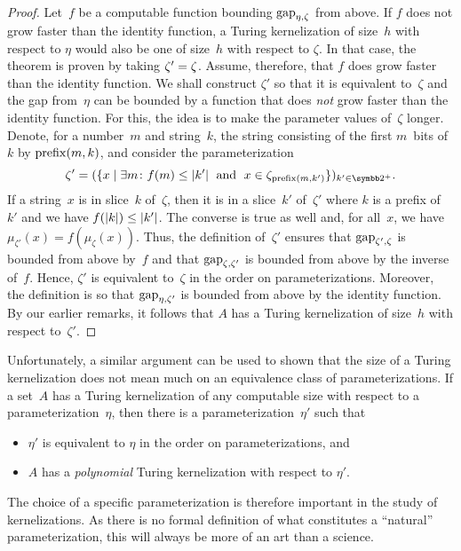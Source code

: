 \begin{proof}
  Let~$f$ be a computable function bounding $\operatorname{gap}_{\eta, \zeta}$ from above.
  If $f$ does not grow faster than the identity function, a Turing kernelization of size~$h$ with respect to $\eta$ would also be one of size~$h$ with respect to $\zeta$.
  In that case, the theorem is proven by taking $\zeta' = \zeta$.
  Assume, therefore, that $f$ does grow faster than the identity function.
  We shall construct $\zeta'$ so that it is equivalent to~$\zeta$ and the gap from~$\eta$ can be bounded by a function that does \emph{not} grow faster than the identity function.
  For this, the idea is to make the parameter values of~$\zeta$ longer.
  Denote, for a number~$m$ and string~$k$, the string consisting of the first $m$~bits of~$k$ by $\operatorname{prefix}(m, k)$, and consider the parameterization
  \begin{equation*}
    \zeta' \deq (\{x \st \exists m\colon f(m) \le \length{k'} \reland x \in \zeta_{\prefix(m, k')}\})_{k' \in \binary^+}.
  \end{equation*}
  If a string~$x$ is in slice~$k$ of~$\zeta$, then it is in a slice~$k'$ of~$\zeta'$ where $k$ is a prefix of~$k'$ and we have $f({\lvert k\rvert}) \le {\lvert k'\rvert}$.
  The converse is true as well and, for all~$x$, we have $\mu_{\zeta'}(x) = f(\mu_\zeta(x))$.
  Thus, the definition of~$\zeta'$ ensures that $\operatorname{gap}_{\zeta', \zeta}$ is bounded from above by~$f$ and that $\operatorname{gap}_{\zeta, \zeta'}$ is bounded from above by the inverse of~$f$.
  Hence, $\zeta'$ is equivalent to~$\zeta$ in the order on parameterizations.
  Moreover, the definition is so that $\operatorname{gap}_{\eta, \zeta'}$ is bounded from above by the identity function.
  By our earlier remarks, it follows that $A$ has a Turing kernelization of size~$h$ with respect to~$\zeta'$.
\end{proof}

Unfortunately, a similar argument can be used to shown that the size of a Turing kernelization does not mean much on an equivalence class of parameterizations.
If a set~$A$ has a Turing kernelization of any computable size with respect to a parameterization~$\eta$, then there is a parameterization~$\eta'$ such that
\begin{itemize}
\item $\eta'$ is equivalent to $\eta$ in the order on parameterizations, and
\item $A$ has a \emph{polynomial} Turing kernelization with respect to $\eta'$.
\end{itemize}
The choice of a specific parameterization is therefore important in the study of kernelizations.
As there is no formal definition of what constitutes a \enquote{natural} parameterization, this will always be more of an art than a science.

